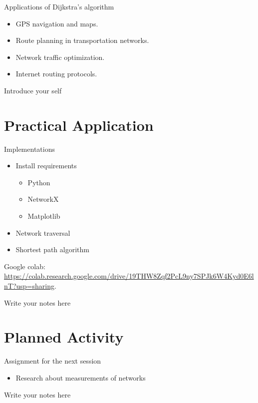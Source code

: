 \documentclass{beamer}
\begin{document}
    \begin{frame}{Applications of Dijkstra's algorithm}
        \begin{itemize}
            \item GPS navigation and maps.
            \item Route planning in transportation networks.
            \item Network traffic optimization.
            \item Internet routing protocols.
        \end{itemize}
        
        \begin{note}
            {Introduce your self}
        \end{note}
    \end{frame}

\section{Practical Application}
    \begin{frame}{Implementations}
        \begin{itemize}
            \item Install requirements
                \begin{itemize}
                    \item Python
                    \item NetworkX
                    \item Matplotlib
                \end{itemize}
            \item Network traversal
            \item Shortest path algorithm
        \end{itemize}
        
        Google colab: \url{https://colab.research.google.com/drive/19THW8Zqf2PcL9ny7SPJk6W4Kyd0E6lnT?usp=sharing}.
        
        \begin{note}
            {Write your notes here}
        \end{note}
    \end{frame}

\section{Planned Activity}
    \begin{frame}{Assignment for the next session}
        \begin{itemize}
            \item Research about measurements of networks
        \end{itemize}
        
        \begin{note}
            {Write your notes here}
        \end{note}
    \end{frame}
\end{document}

